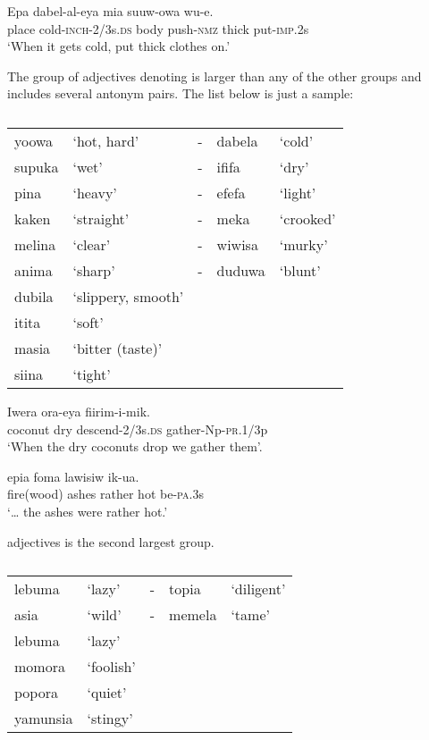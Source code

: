 \ea%
\label{ex:x77}
\gll Epa dabel-al-eya mia suuw-owa   wu-e. \\
place cold-\textsc{inch}-2/3s.\textsc{ds} body push-\textsc{nmz} thick put-\textsc{imp}.2s\\
\glt`When it gets cold, put thick clothes on.'
\z

The group of adjectives denoting  is larger than any of the other groups and includes several antonym pairs. The list below is just a sample:

\begin{table}
\caption{}
\label{} 
\begin{tabular}{llcll}
yoowa &`hot, hard' &- &dabela &`cold'\\
supuka &`wet' &- &ififa &`dry'\\
pina &`heavy' &- &efefa &`light'\\
kaken &`straight' &- &meka &`crooked'\\
melina &`clear' &- &wiwisa &`murky'\\
anima &`sharp' &- &duduwa &`blunt'\\
dubila &`slippery, smooth'&&&\\
itita &`soft'&&&\\
masia &`bitter (taste)'&&&\\
siina &`tight'&&&\\
\end{tabular}
\end{table}

\ea%
\label{ex:x78}
\gll Iwera  ora-eya fiirim-i-mik. \\
coconut dry descend-2/3s.\textsc{ds} gather-Np-\textsc{pr}.1/3p\\
\glt`When the dry coconuts drop we gather them'.
\z

\ea%
\label{ex:x1758}
\gll {\dots}epia foma lawisiw  ik-ua. \\
fire(wood) ashes rather hot be-\textsc{pa}.3s\\
\glt`{\dots} the ashes were rather hot.'
\z

 adjectives is the second largest group. 


\begin{table}
\caption{}
\label{} 
\begin{tabular}{llcll}
lebuma &`lazy' &- &topia &`diligent'\\
asia &`wild' &- &memela &`tame'\\
lebuma &`lazy'&&&\\
momora &`foolish'&&&\\
popora &`quiet'&&&\\
yamunsia &`stingy'&&&\\
\end{tabular}
\end{table}

